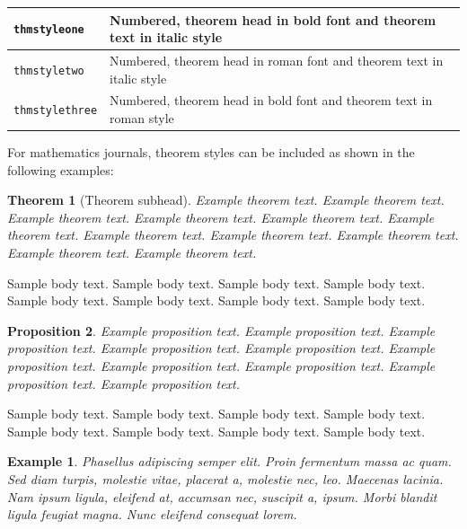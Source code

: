 \documentclass[pdflatex,sn-mathphys-ay]{sn-jnl}%
\theoremstyle{thmstyleone}%
\newtheorem{theorem}{Theorem}%
\newtheorem{proposition}[theorem]{Proposition}%
\theoremstyle{thmstyletwo}%
\newtheorem{example}{Example}%
\theoremstyle{thmstylethree}%
\begin{document}
\bigskip
\begin{tabular}{|l|p{19pc}|}
\hline
\verb+thmstyleone+ & Numbered, theorem head in bold font and theorem text in italic style \\\hline
\verb+thmstyletwo+ & Numbered, theorem head in roman font and theorem text in italic style \\\hline
\verb+thmstylethree+ & Numbered, theorem head in bold font and theorem text in roman style \\\hline
\end{tabular}
\bigskip

For mathematics journals, theorem styles can be included as shown in the following examples:

\begin{theorem}[Theorem subhead]\label{thm1}
Example theorem text. Example theorem text. Example theorem text. Example theorem text. Example theorem text. 
Example theorem text. Example theorem text. Example theorem text. Example theorem text. Example theorem text. 
Example theorem text. 
\end{theorem}

Sample body text. Sample body text. Sample body text. Sample body text. Sample body text. Sample body text. Sample body text. Sample body text.

\begin{proposition}
Example proposition text. Example proposition text. Example proposition text. Example proposition text. Example proposition text. 
Example proposition text. Example proposition text. Example proposition text. Example proposition text. Example proposition text. 
\end{proposition}

Sample body text. Sample body text. Sample body text. Sample body text. Sample body text. Sample body text. Sample body text. Sample body text.

\begin{example}
Phasellus adipiscing semper elit. Proin fermentum massa
ac quam. Sed diam turpis, molestie vitae, placerat a, molestie nec, leo. Maecenas lacinia. Nam ipsum ligula, eleifend
at, accumsan nec, suscipit a, ipsum. Morbi blandit ligula feugiat magna. Nunc eleifend consequat lorem. 
\end{example}
\end{document}
